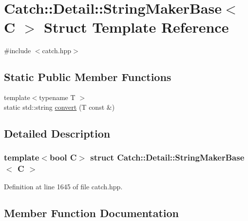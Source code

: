 \hypertarget{struct_catch_1_1_detail_1_1_string_maker_base}{}\section{Catch\+:\+:Detail\+:\+:String\+Maker\+Base$<$ C $>$ Struct Template Reference}
\label{struct_catch_1_1_detail_1_1_string_maker_base}


{\ttfamily \#include $<$catch.\+hpp$>$}

\subsection*{Static Public Member Functions}
\begin{DoxyCompactItemize}
\item 
{\footnotesize template$<$typename T $>$ }\\static std\+::string \hyperlink{struct_catch_1_1_detail_1_1_string_maker_base_a8eb9f635dc413a5758e22614bafaf1a3}{convert} (T const \&)
\end{DoxyCompactItemize}


\subsection{Detailed Description}
\subsubsection*{template$<$bool C$>$\newline
struct Catch\+::\+Detail\+::\+String\+Maker\+Base$<$ C $>$}



Definition at line 1645 of file catch.\+hpp.



\subsection{Member Function Documentation}
\hypertarget{struct_catch_1_1_detail_1_1_string_maker_base_a8eb9f635dc413a5758e22614bafaf1a3}{}\label{struct_catch_1_1_detail_1_1_string_maker_base_a8eb9f635dc413a5758e22614bafaf1a3} 
